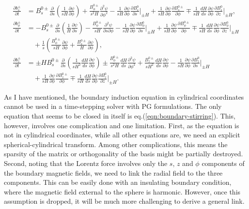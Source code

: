 \begin{equation}
    \begin{aligned}
        \frac{\partial b_s^\pm}{\partial t} &= B_s^{0\pm} \frac{\partial}{\partial s} \left(\frac{1}{sH}\frac{\partial \psi}{\partial \phi}\right) + \frac{B_\phi^{0\pm}}{s^2 H} \frac{\partial^2 \psi}{\partial \phi^2} - \frac{1}{sH} \frac{\partial \psi}{\partial \phi} \frac{\partial B_s^0}{\partial s}\bigg|_{\pm H} + \frac{1}{sH} \frac{\partial \psi}{\partial \phi} \frac{\partial B_s^{0\pm}}{\partial \phi} \mp \frac{1}{sH} \frac{dH}{ds}\frac{\partial \psi}{\partial \phi} \frac{\partial B_s^0}{\partial z}\bigg|_{\pm H}, \\ 
        \frac{\partial b_\phi^\pm}{\partial t} &= -B_s^{0\pm} \frac{\partial}{\partial s}\left(\frac{1}{H}\frac{\partial \psi}{\partial s}\right) - \frac{B_\phi^{0\pm}}{sH} \frac{\partial^2 \psi}{\partial s \partial \phi} - \frac{1}{sH} \frac{\partial \psi}{\partial \phi} \frac{\partial B_\phi^0}{\partial s}\bigg|_{\pm H} + \frac{1}{sH} \frac{\partial \psi}{\partial \phi} \frac{\partial B_\phi^{0\pm}}{\partial \phi} \mp \frac{1}{sH} \frac{dH}{ds}\frac{\partial \psi}{\partial \phi} \frac{\partial B_\phi^0}{\partial z}\bigg|_{\pm H} \\
        &\quad + \frac{1}{s}\left(\frac{B_\phi^{0\pm}}{sH}\frac{\partial \psi}{\partial \phi} + \frac{B_s^{0\pm}}{H}\frac{\partial \psi}{\partial \phi}\right), \\ 
        \frac{\partial b_z^\pm}{\partial t} &= \pm H B_s^{0\pm} \frac{\partial}{\partial s}\left(\frac{1}{sH^2}\frac{dH}{ds}\frac{\partial \psi}{\partial \phi}\right) \pm \frac{B_\phi^{0\pm}}{s^2 H} \frac{dH}{ds} \frac{\partial^2 \psi}{\partial \phi^2} + \frac{B_z^{0\pm}}{sH^2}\frac{dH}{ds}\frac{\partial \psi}{\partial \phi} - \frac{1}{sH}\frac{\partial \psi}{\partial \phi} \frac{\partial B_z^0}{\partial s}\bigg|_{\pm H} \\
        &\quad + \frac{1}{sH} \frac{\partial \psi}{\partial \phi} \frac{\partial B_z^{0\pm}}{\partial \phi} \mp \frac{1}{sH} \frac{dH}{ds}\frac{\partial \psi}{\partial \phi} \frac{\partial B_z^0}{\partial z}\bigg|_{\pm H}.
    \end{aligned}
\end{equation}

As I have mentioned, the boundary induction equation in cylindrical coordinates cannot be used in a time-stepping solver with PG formulations. The only equation that seems to be closed in itself is eq.(\ref{eqn:boundary-stirring}). This, however, involves one complication and one limitation. First, as the equation is not in cylindrical coordinates, while all other equations are, we need an explicit spherical-cylindrical transform. Among other complications, this means the sparsity of the matrix or orthogonality of the basis might be partially destroyed. Second, noting that the Lorentz force involves only the $s$, $z$ and $\phi$ components of the boundary magnetic fields, we need to link the radial field to the three components. This can be easily done with an insulating boundary condition, where the magnetic field external to the sphere is harmonic. However, once this assumption is dropped, it will be much more challenging to derive a general link.
